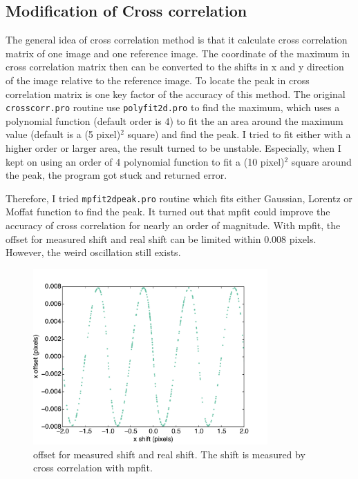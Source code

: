 \documentclass[paper=letter, fontsize=11pt]{scrartcl} %
\numberwithin{equation}{section} %
\numberwithin{figure}{section} %
\numberwithin{table}{section} %
\begin{document}
\subsection{Modification of  Cross correlation}
The general idea of cross correlation method is that it calculate
cross correlation matrix of one image and one reference image. The
coordinate of the maximum in cross correlation matrix then can be
converted to the shifts in x and y direction of the image  relative to
the reference image. To locate the peak in cross correlation matrix
is one key factor of the accuracy of this method. The original
\texttt{crosscorr.pro} routine use \texttt{polyfit2d.pro} to find the
maximum, which uses a polynomial function (default order is 4) to fit
the an area around the maximum value (default is a (5 pixel)$^{2}$
square) and find the peak. I tried to fit either with a higher order
or larger area, the result turned to be unstable. Especially, when I
kept on using an order of 4 polynomial function to fit a (10
pixel)$^{2}$ square around the peak, the program got stuck and
returned error.\par

Therefore, I tried \texttt{mpfit2dpeak.pro} routine which fits either
Gaussian, Lorentz or Moffat function to find the peak. It turned out
that  mpfit could improve the accuracy of cross correlation for
nearly an order of magnitude. With mpfit, the offset for measured
shift and real shift can be limited within 0.008 pixels. However, the
weird oscillation still exists.\par

\begin{figure}[h]
  \centering
  \includegraphics[width=0.8\textwidth]{crosscorr_cenTest2}
  \caption{offset for measured shift and real shift. The shift is measured by cross correlation with mpfit.}
\end{figure}
\end{document}

